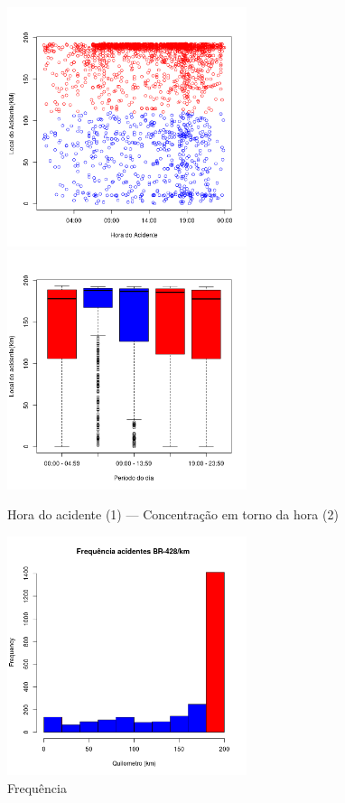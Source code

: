 \pagebreak


\begin{figure}[h]
	\caption{Hora do acidente (1) --- Concentração em torno da hora (2)}
	\includegraphics[width=7cm,height=7cm]{Figuras/Preprocess/br428_1.png}
	\includegraphics[width=7cm,height=7cm]{Figuras/Preprocess/br428_2.png}
	
\end{figure}

\quad \quad
\begin{figure}[h]
	\centering
	\caption{ Frequência}
	\includegraphics[width=7cm,height=7cm]{Figuras/Preprocess/br428_3.png}
\end{figure}


